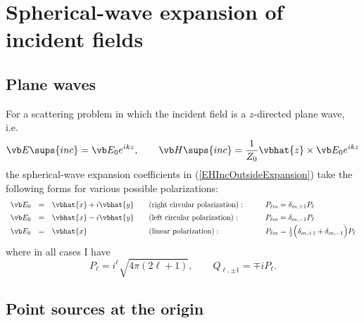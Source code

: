 \documentclass[letterpaper]{article}
\newcommand{\lm}{_{\ell m}}
\begin{document}
\section{Spherical-wave expansion of incident fields}

\subsection{Plane waves}
\label{PlaneWaveSection}

For a scattering problem in which the incident field
is a $z$-directed plane wave, i.e.
$$
 \vb E\sups{inc}=\vb E_0e^{ik z}, \qquad 
 \vb H\sups{inc}=\frac{1}{Z_0}\vbhat{z}\times \vb E_0 e^{ik z}
$$
the spherical-wave expansion coefficients in (\ref{EHIncOutsideExpansion})
take the following forms for various possible polarizations:
$$\begin{array}{rclll}
\vb E_0 &=& \vbhat{x} + i\vbhat{y} 
 \quad &\text{(right circular polarization)}:
 \qquad &P\lm=\delta_{m,+1}P_\ell
\\[5pt]
\vb E_0 &=& \vbhat{x} - i\vbhat{y} 
 \quad &\text{(left circular polarization)}:
 \qquad &P\lm=\delta_{m,-1}P_\ell 
\\[3pt]
\vb E_0 &=& \vbhat{x}
 \quad &\text{(linear polarization)}:
 \qquad &P\lm=\frac{1}{2}\Big(\delta_{m,+1} + \delta_{m,-1}\Big)P_\ell 
\end{array}$$
where in all cases I have
$$ P_\ell = i^\ell \sqrt{4\pi(2\ell +1)}, \qquad  
   Q_{\ell, \pm 1} = \mp i P_\ell.
$$

\subsection{Point sources at the origin}
\label{PointSourceAtOriginSection}
\end{document}

